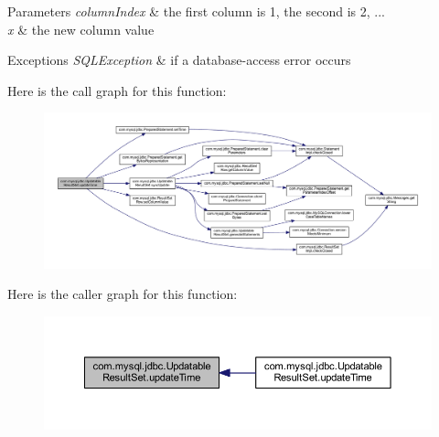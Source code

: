 \begin{DoxyParams}{Parameters}
{\em column\+Index} & the first column is 1, the second is 2, ... \\
\hline
{\em x} & the new column value\\
\hline
\end{DoxyParams}

\begin{DoxyExceptions}{Exceptions}
{\em S\+Q\+L\+Exception} & if a database-\/access error occurs \\
\hline
\end{DoxyExceptions}
Here is the call graph for this function\+:
\nopagebreak
\begin{figure}[H]
\begin{center}
\leavevmode
\includegraphics[width=350pt]{classcom_1_1mysql_1_1jdbc_1_1_updatable_result_set_a72c299ac228ddd995fe6f1499d5da439_cgraph}
\end{center}
\end{figure}
Here is the caller graph for this function\+:
\nopagebreak
\begin{figure}[H]
\begin{center}
\leavevmode
\includegraphics[width=350pt]{classcom_1_1mysql_1_1jdbc_1_1_updatable_result_set_a72c299ac228ddd995fe6f1499d5da439_icgraph}
\end{center}
\end{figure}
\mbox{\label{classcom_1_1mysql_1_1jdbc_1_1_updatable_result_set_a92f4018fe4868d05817bfe39a711fe79}} 
